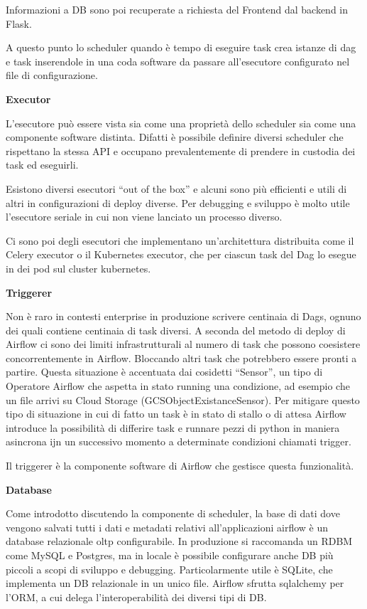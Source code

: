 \documentclass[a4paper,12pt]{report}
\begin{document}
Informazioni a DB sono poi recuperate  a richiesta del Frontend dal backend in Flask.

A questo punto lo scheduler quando è tempo di eseguire task crea istanze di dag e task inserendole in una coda software da passare all’esecutore configurato nel file di configurazione.

\noindent
\textbf{Executor}

L’esecutore può essere vista sia come una proprietà dello scheduler sia come una componente software distinta. Difatti è possibile definire diversi scheduler che rispettano la stessa API e occupano prevalentemente di prendere in custodia dei task ed eseguirli.

Esistono diversi esecutori “out of the box” e alcuni sono più efficienti e utili di altri in configurazioni di deploy diverse. Per debugging e sviluppo è molto utile l’esecutore seriale in cui non viene lanciato un processo diverso. 

Ci sono poi degli esecutori che implementano un’architettura distribuita come il Celery executor o il Kubernetes executor, che per ciascun task del Dag lo esegue in dei pod sul cluster kubernetes.


\noindent
\textbf{Triggerer}

Non è raro in contesti enterprise in produzione scrivere centinaia di Dags, ognuno dei quali contiene centinaia di task diversi. A seconda del metodo di deploy di Airflow ci sono dei limiti infrastrutturali al numero di task che possono coesistere concorrentemente in Airflow. Bloccando altri task che potrebbero essere pronti a partire. Questa situazione è accentuata dai cosidetti “Sensor”, un tipo di Operatore Airflow che aspetta in stato running una condizione, ad esempio che un file arrivi su Cloud Storage (GCSObjectExistanceSensor). Per mitigare questo tipo di situazione in cui di fatto un task è in stato di stallo o di attesa Airflow introduce la possibilità di differire task e runnare pezzi di python in maniera asincrona ijn un successivo momento a determinate condizioni chiamati trigger.

Il triggerer è la componente software di Airflow che gestisce questa funzionalità.

\noindent
\textbf{Database}

Come introdotto discutendo la componente di scheduler, la base di dati dove vengono salvati tutti i dati e metadati relativi all’applicazioni airflow è un database relazionale oltp configurabile. In produzione si raccomanda un RDBM come MySQL e Postgres, ma in locale è possibile configurare anche DB più piccoli a scopi di sviluppo e debugging. Particolarmente utile è SQLite, che implementa un DB relazionale in un unico file. Airflow sfrutta sqlalchemy per l’ORM, a cui delega l’interoperabilità dei diversi tipi di DB. 
\end{document}
